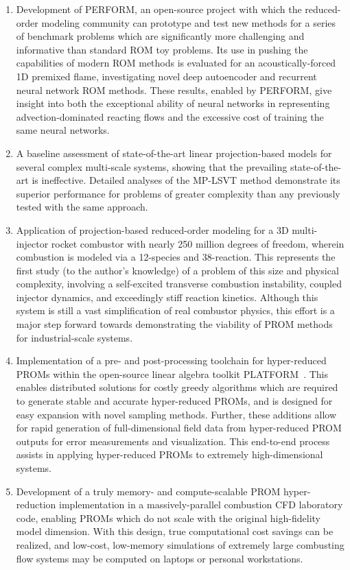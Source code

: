 \begin{enumerate}
    \item Development of PERFORM, an open-source project with which the reduced-order modeling community can prototype and test new methods for a series of benchmark problems which are significantly more challenging and informative than standard ROM toy problems. Its use in pushing the capabilities of modern ROM methods is evaluated for an acoustically-forced 1D premixed flame, investigating novel deep autoencoder and recurrent neural network ROM methods. These results, enabled by PERFORM, give insight into both the exceptional ability of neural networks in representing advection-dominated reacting flows and the excessive cost of training the same neural networks.
    \item A baseline assessment of state-of-the-art linear projection-based models for several complex multi-scale systems, showing that the prevailing state-of-the-art is ineffective. Detailed analyses of the MP-LSVT method demonstrate its superior performance for problems of greater complexity than any previously tested with the same approach.
    \item Application of projection-based reduced-order modeling for a 3D multi-injector rocket combustor with nearly 250 million degrees of freedom, wherein combustion is modeled via a 12-species and 38-reaction. This represents the first study (to the author's knowledge) of a problem of this size and physical complexity, involving a self-excited transverse combustion instability, coupled injector dynamics, and exceedingly stiff reaction kinetics. Although this system is still a vast simplification of real combustor physics, this effort is a major step forward towards demonstrating the viability of PROM methods for industrial-scale systems.
    \item Implementation of a pre- and post-processing toolchain for hyper-reduced PROMs within the open-source linear algebra toolkit PLATFORM~\cite{PLATFORM}. This enables distributed solutions for costly greedy algorithms which are required to generate stable and accurate hyper-reduced PROMs, and is designed for easy expansion with novel sampling methods. Further, these additions allow for rapid generation of full-dimensional field data from hyper-reduced PROM outputs for error measurements and visualization. This end-to-end process assists in applying hyper-reduced PROMs to extremely high-dimensional systems.
    \item Development of a truly memory- and compute-scalable PROM hyper-reduction implementation in a massively-parallel combustion CFD laboratory code, enabling PROMs which do not scale with the original high-fidelity model dimension. With this design, true computational cost savings can be realized, and low-cost, low-memory simulations of extremely large combusting flow systems may be computed on laptops or personal workstations.

\end{enumerate}
